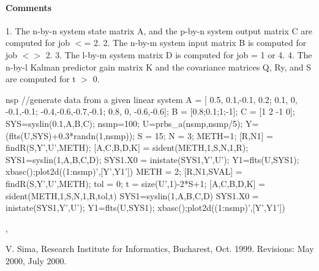 \paragraph{Comments}
1. The n-by-n system state matrix A, and the p-by-n system output  matrix C are computed for job $<$= 2.
2. The n-by-m system input matrix B is computed for job $<$$>$ 2.
3. The l-by-m system matrix D is computed for job = 1 or 4.
4. The n-by-l Kalman predictor gain matrix K and the covariance matrices Q, Ry, and S are computed for t $>$ 0.
\begin{examples}
  \begin{mintednsp}{nsp}
    //generate data from a given linear system
    A = [ 0.5, 0.1,-0.1, 0.2;
      0.1, 0,  -0.1,-0.1;      
      -0.4,-0.6,-0.7,-0.1;  
      0.8, 0,  -0.6,-0.6];      
    B = [0.8;0.1;1;-1];
    C = [1 2 -1 0];
    SYS=syslin(0.1,A,B,C);
    nsmp=100;
    U=prbs_a(nsmp,nsmp/5);
    Y=(flts(U,SYS)+0.3*randn(1,nsmp));
    S = 15;
    N = 3;
    METH=1;
    [R,N1] = findR(S,Y',U',METH);
    [A,C,B,D,K] = sident(METH,1,S,N,1,R);
    SYS1=syslin(1,A,B,C,D);
    SYS1.X0 = inistate(SYS1,Y',U');
    Y1=flts(U,SYS1);
    xbasc();plot2d((1:nsmp)',[Y',Y1'])
    METH = 2;
    [R,N1,SVAL] = findR(S,Y',U',METH);
    tol = 0;
    t = size(U',1)-2*S+1;
    [A,C,B,D,K] = sident(METH,1,S,N,1,R,tol,t)
    SYS1=syslin(1,A,B,C,D)
    SYS1.X0 = inistate(SYS1,Y',U');
    Y1=flts(U,SYS1);
    xbasc();plot2d((1:nsmp)',[Y',Y1'])
  \end{mintednsp}
\end{examples}
\begin{manseealso}
  ,   
\end{manseealso}
\begin{authors}
  V. Sima, Research Institute for Informatics, Bucharest, Oct. 1999. 
  Revisions: May 2000, July 2000. 
\end{authors}
